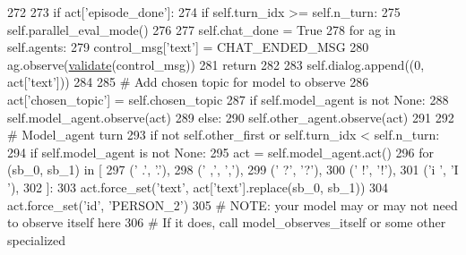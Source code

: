 \begin{DoxyCode}
272 
273         \textcolor{keywordflow}{if} act[\textcolor{stringliteral}{'episode\_done'}]:
274             \textcolor{keywordflow}{if} self.turn\_idx >= self.n\_turn:
275                 self.parallel\_eval\_mode()
276 
277                 self.chat\_done = \textcolor{keyword}{True}
278                 \textcolor{keywordflow}{for} ag \textcolor{keywordflow}{in} self.agents:
279                     control\_msg[\textcolor{stringliteral}{'text'}] = CHAT\_ENDED\_MSG
280                     ag.observe(\hyperlink{namespaceparlai_1_1core_1_1worlds_afc3fad603b7bce41dbdc9cdc04a9c794}{validate}(control\_msg))
281             \textcolor{keywordflow}{return}
282 
283         self.dialog.append((0, act[\textcolor{stringliteral}{'text'}]))
284 
285         \textcolor{comment}{# Add chosen topic for model to observe}
286         act[\textcolor{stringliteral}{'chosen\_topic'}] = self.chosen\_topic
287         \textcolor{keywordflow}{if} self.model\_agent \textcolor{keywordflow}{is} \textcolor{keywordflow}{not} \textcolor{keywordtype}{None}:
288             self.model\_agent.observe(act)
289         \textcolor{keywordflow}{else}:
290             self.other\_agent.observe(act)
291 
292         \textcolor{comment}{# Model\_agent turn}
293         \textcolor{keywordflow}{if} \textcolor{keywordflow}{not} self.other\_first \textcolor{keywordflow}{or} self.turn\_idx < self.n\_turn:
294             \textcolor{keywordflow}{if} self.model\_agent \textcolor{keywordflow}{is} \textcolor{keywordflow}{not} \textcolor{keywordtype}{None}:
295                 act = self.model\_agent.act()
296                 \textcolor{keywordflow}{for} (sb\_0, sb\_1) \textcolor{keywordflow}{in} [
297                     (\textcolor{stringliteral}{' .'}, \textcolor{stringliteral}{'.'}),
298                     (\textcolor{stringliteral}{' ,'}, \textcolor{stringliteral}{','}),
299                     (\textcolor{stringliteral}{' ?'}, \textcolor{stringliteral}{'?'}),
300                     (\textcolor{stringliteral}{' !'}, \textcolor{stringliteral}{'!'}),
301                     (\textcolor{stringliteral}{'i '}, \textcolor{stringliteral}{'I '}),
302                 ]:
303                     act.force\_set(\textcolor{stringliteral}{'text'}, act[\textcolor{stringliteral}{'text'}].replace(sb\_0, sb\_1))
304                 act.force\_set(\textcolor{stringliteral}{'id'}, \textcolor{stringliteral}{'PERSON\_2'})
305                 \textcolor{comment}{# NOTE: your model may or may not need to observe itself here}
306                 \textcolor{comment}{# If it does, call model\_observes\_itself or some other specialized}

\end{DoxyCode}
